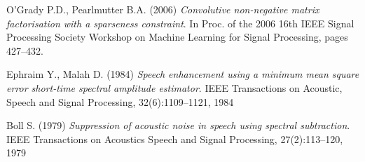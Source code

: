 \documentclass[11pt]{article}
\begin{document}
\begin{thebibliography}{99}
 O’Grady P.D., Pearlmutter B.A. (2006) \textit{Convolutive non-negative matrix factorisation with a sparseness constraint}. In Proc. of the 2006 16th IEEE Signal Processing Society Workshop on Machine Learning for Signal Processing, pages 427–432.

 Ephraim Y., Malah D. (1984) \textit{Speech enhancement using a minimum mean square error short-time spectral amplitude estimator}. IEEE Transactions on Acoustic, Speech and Signal Processing, 32(6):1109–1121, 1984

  Boll S. (1979) \textit{Suppression of acoustic noise in speech using spectral subtraction}. IEEE Transactions on Acoustics Speech and Signal Processing,
27(2):113–120, 1979

\end{thebibliography}{}
\end{document}
